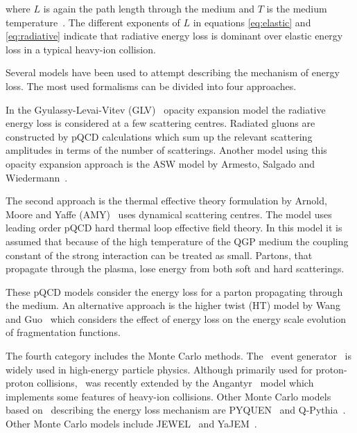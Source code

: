 \noindent where $L$ is again the path length through the medium and $T$ is the medium temperature~\cite{Dominguez:2008vd}. The different exponents of $L$ in equations \ref{eq:elastic} and \ref{eq:radiative} indicate that radiative energy loss is dominant over elastic energy loss in a typical heavy-ion collision.

Several models have been used to attempt describing the mechanism of energy loss. The most used formalisms can be divided into four approaches.
%

In the Gyulassy-Levai-Vitev (GLV)~\cite{Gyulassy:1999zd} opacity expansion model the radiative energy loss is considered at a few scattering centres. Radiated gluons are constructed by pQCD calculations which sum up the relevant scattering amplitudes in terms of the number of scatterings. Another model using this opacity expansion approach is the ASW model by Armesto, Salgado and Wiedermann~\cite{Wiedemann:2000za}.

The second approach is the thermal effective theory formulation by Arnold, Moore and Yaffe (AMY)~\cite{Arnold:2001ms} uses dynamical scattering centres. The model uses leading order pQCD hard thermal loop effective field theory. In this model it is assumed that because of the high temperature of the QGP medium the coupling constant of the strong interaction can be treated as small. Partons, that propagate through the plasma, lose energy from both soft and hard scatterings.

These pQCD models consider the energy loss for a parton propagating through the medium. An alternative approach is the higher twist (HT) model by Wang and Guo~\cite{Wang:2001ifa} which considers the effect of energy loss on the energy scale evolution of fragmentation functions.

The fourth category includes the Monte Carlo methods. The \pythia~event generator~\cite{pythia} is widely used in high-energy particle physics. Although primarily used for proton-proton collisions, \pythia~was recently extended by the Angantyr~\cite{Bierlich:2018xfw} model which implements some features of heavy-ion collisions. Other Monte Carlo models based on \pythia~describing the energy loss mechanism are PYQUEN~\cite{Lokhtin:2005px} and Q-Pythia~\cite{Armesto:2009zc}. Other Monte Carlo models include JEWEL~\cite{Zapp:2008gi} and YaJEM~\cite{Renk:2009nz}. 





